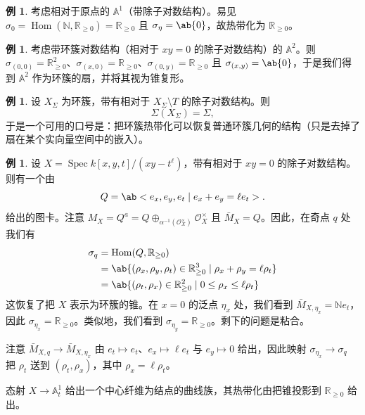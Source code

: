 \documentclass{amsart}
\theoremstyle{definition}
\newtheorem{exm}[thm]{例}
\theoremstyle{remark}
\theoremstyle{plain}
\theoremstyle{definition}
\theoremstyle{remark}
\newcommand{\A}{\mathbb{A}}
\newcommand{\N}{\mathbb{N}}
\newcommand{\R}{\mathbb{R}}
\newcommand{\mc}[1]{\mathcal{#1}}
\newcommand{\1}{\mathbf{1}}
\newcommand{\2}{\mathbf{2}}
\newcommand{\3}{\mathbf{3}}
\DeclareMathOperator{\Hom}{Hom}
\DeclareMathOperator{\Spec}{Spec}
\begin{document}
\begin{exm}
    考虑相对于原点的 \(\A^1\)（带除子对数结构）。易见 \(\sigma_0 = \Hom(\N, \R_{\geq 0}) = \R_{\geq 0}\) 且 \(\sigma_{\eta} = \ab\{0\}\)，故热带化为 \(\R_{\geq 0}\)。
\end{exm}

\begin{exm}
    考虑带环簇对数结构（相对于 \(xy = 0\) 的除子对数结构）的 \(\A^2\)。则 \(\sigma_{(0,0)} = \R^2_{\geq 0}\)、\(\sigma_{(x,0)} = \R_{\geq 0}\)、\(\sigma_{(0,y)} = \R_{\geq 0}\) 且 \(\sigma_{(x,y)} = \ab\{0\}\)，于是我们得到 \(\A^2\) 作为环簇的扇，并将其视为锥复形。
\end{exm}

\begin{exm}
    设 \(X_{\Sigma}\) 为环簇，带有相对于 \(X_{\Sigma} \setminus T\) 的除子对数结构。则
    \[ \Sigma(X_{\Sigma}) = \Sigma, \]
    于是一个可用的口号是：把环簇热带化可以恢复普通环簇几何的结构（只是去掉了扇在某个实向量空间中的嵌入）。
\end{exm}

\begin{exm}
    设 \(X = \Spec k[x,y,t]/(xy-t^{\ell})\)，带有相对于 \(xy = 0\) 的除子对数结构。则有一个由
    \[ Q = \ab<e_x, e_y, e_t \mid e_x + e_y = \ell e_t>. \]
    给出的图卡。注意 \(M_X = Q^a = Q \oplus_{\alpha^{-1}(\mc{O}_X^{\times})} \mc{O}_X^{\times}\) 且 \(\bar{M}_X = Q\)。因此，在奇点 \(q\) 处我们有
    \begin{align*}
        \sigma_q &= \Hom(Q, \R_{\geq 0}) \\
        &= \ab\{ (\rho_x, \rho_y, \rho_t) \in \R_{\geq 0}^3 \mid \rho_x + \rho_y = \ell \rho_t \} \\
        &= \ab\{ (\rho_t, \rho_x) \in \R_{\geq 0}^2 \mid 0 \leq \rho_x \leq \ell \rho_t \}
    \end{align*}
    这恢复了把 \(X\) 表示为环簇的锥。在 \(x = 0\) 的泛点 \(\eta_x\) 处，我们看到 \(\bar{M}_{X, \eta_x} = \N e_t\)，因此 \(\sigma_{\eta_x} = \R_{\geq 0}\)。类似地，我们看到 \(\sigma_{\eta_y} = \R_{\geq 0}\)。剩下的问题是粘合。

    注意 \(\bar{M}_{X, q} \to \bar{M}_{X, \eta_x}\) 由 \(e_t \mapsto e_t\)、\(e_x \mapsto \ell e_t\) 与 \(e_y \mapsto 0\) 给出，因此映射 \(\sigma_{\eta_x} \to \sigma_q\) 把 \(\rho_t\) 送到 \((\rho_t, \rho_x)\)，其中 \(\rho_x = \ell \rho_t\)。

    态射 \(X \to \A^1_t\) 给出一个中心纤维为结点的曲线族，其热带化由把锥投影到 \(\R_{\geq 0}\) 给出。
\end{exm}
\end{document}
